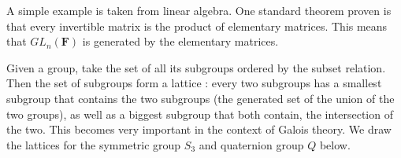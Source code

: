 A simple example is taken from linear algebra. One standard theorem proven is that every invertible matrix is the product of elementary matrices. This means that $GL_n(\mathbf{F})$ is generated by the elementary matrices.

Given a group, take the set of all its subgroups ordered by the subset relation. Then the set of subgroups form a lattice : every two subgroups has a smallest subgroup that contains the two subgroups (the generated set of the union of the two groups), as well as a biggest subgroup that both contain, the intersection of the two. This becomes very important in the context of Galois theory. We draw the lattices for the symmetric group $S_3$ and quaternion group $Q$ below.

\begin{center}
\end{center}


